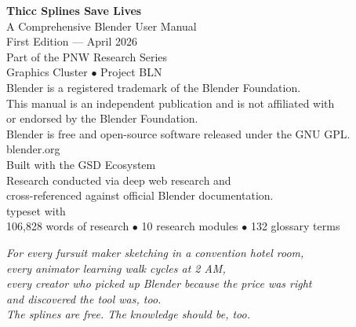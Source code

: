 \documentclass[11pt,letterpaper,twoside,openright]{book}
\begin{document}
\thispagestyle{empty}
\vspace*{\fill}
\begin{center}
{\small\sffamily
\textbf{Thicc Splines Save Lives}\\[0.5em]
A Comprehensive Blender User Manual\\[0.3em]
First Edition --- April 2026\\[1.5em]

Part of the PNW Research Series\\
Graphics Cluster $\bullet$ Project BLN\\[1em]

Blender is a registered trademark of the Blender Foundation.\\
This manual is an independent publication and is not affiliated with\\
or endorsed by the Blender Foundation.\\[1em]

Blender is free and open-source software released under the GNU GPL.\\
blender.org\\[2em]

Built with the GSD Ecosystem\\
Research conducted via deep web research and\\
cross-referenced against official Blender documentation.\\[1em]

typeset with \XeLaTeX\\[2em]

{\footnotesize 106,828 words of research $\bullet$ 10 research modules $\bullet$ 132 glossary terms}
}
\end{center}
\vspace*{\fill}
\newpage

\thispagestyle{empty}
\vspace*{4cm}
\begin{center}
{\large\itshape\sffamily\textcolor{primary}{
For every fursuit maker sketching in a convention hotel room,\\[0.5em]
every animator learning walk cycles at 2 AM,\\[0.5em]
every creator who picked up Blender because the price was right\\[0.5em]
and discovered the tool was, too.\\[1.5em]
The splines are free. The knowledge should be, too.
}}
\end{center}
\newpage
\end{document}
